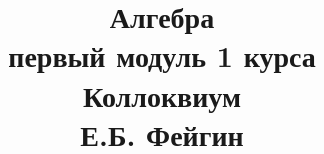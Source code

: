 \documentclass[fleqn]{article}
\title{Алгебра \\ первый модуль 1 курса \\ Коллоквиум \\ Е.Б. Фейгин}
\begin{document}
	\maketitle
	\pagebreak
	
	
	\tableofcontents
	
	\newpage

			
\end{document}
